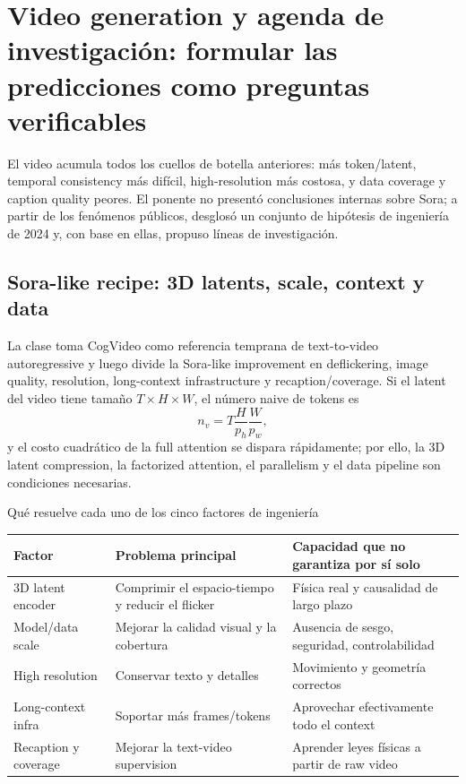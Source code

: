 \section{Video generation y agenda de investigación: formular las predicciones como preguntas verificables}

El video acumula todos los cuellos de botella anteriores: más token/latent, temporal consistency más difícil, high-resolution más costosa, y data coverage y caption quality peores. El ponente no presentó conclusiones internas sobre Sora; a partir de los fenómenos públicos, desglosó un conjunto de hipótesis de ingeniería de 2024 y, con base en ellas, propuso líneas de investigación.

\subsection{Sora-like recipe: 3D latents, scale, context y data}

La clase toma CogVideo como referencia temprana de text-to-video autoregressive y luego divide la Sora-like improvement en deflickering, image quality, resolution, long-context infrastructure y recaption/coverage. Si el latent del video tiene tamaño $T\times H\times W$, el número naive de tokens es
\[
n_v=T\frac{H}{p_h}\frac{W}{p_w},
\]
y el costo cuadrático de la full attention se dispara rápidamente; por ello, la 3D latent compression, la factorized attention, el parallelism y el data pipeline son condiciones necesarias.


\begin{knowledgebox}{Qué resuelve cada uno de los cinco factores de ingeniería}
\small\sloppy
\begin{tabularx}{\textwidth}{L{0.19\textwidth} L{0.32\textwidth} X}
\toprule
Factor & Problema principal & Capacidad que no garantiza por sí solo \\
\midrule
3D latent encoder & Comprimir el espacio-tiempo y reducir el flicker & Física real y causalidad de largo plazo \\
Model/data scale & Mejorar la calidad visual y la cobertura & Ausencia de sesgo, seguridad, controlabilidad \\
High resolution & Conservar texto y detalles & Movimiento y geometría correctos \\
Long-context infra & Soportar más frames/tokens & Aprovechar efectivamente todo el context \\
Recaption y coverage & Mejorar la text-video supervision & Aprender leyes físicas a partir de raw video \\
\bottomrule
\end{tabularx}
\end{knowledgebox}

